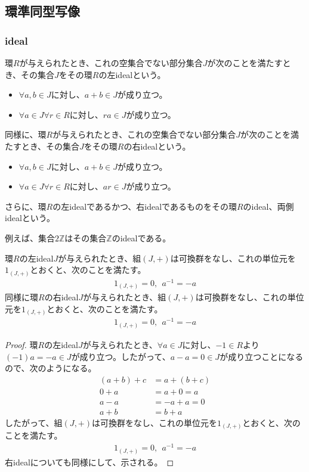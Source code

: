 \documentclass[dvipdfmx]{jsarticle}
\begin{document}
\subsection{環準同型写像}%
\subsubsection{ideal}%
\begin{axs}[idealの公理]
環$R$が与えられたとき、これの空集合でない部分集合$J$が次のことを満たすとき、その集合$J$をその環$R$の左idealという。
\begin{itemize}
\item
  $\forall a,b \in J$に対し、$a + b \in J$が成り立つ。
\item
  $\forall a \in J\forall r \in R$に対し、$ra \in J$が成り立つ。
\end{itemize}
同様に、環$R$が与えられたとき、これの空集合でない部分集合$J$が次のことを満たすとき、その集合$J$をその環$R$の右idealという。
\begin{itemize}
\item
  $\forall a,b \in J$に対し、$a + b \in J$が成り立つ。
\item
  $\forall a \in J\forall r \in R$に対し、$ar \in J$が成り立つ。
\end{itemize}
さらに、環$R$の左idealであるかつ、右idealであるものをその環$R$のideal、両側idealという。
\end{axs}\par
例えば、集合$2\mathbb{Z}$はその集合$\mathbb{Z}$のidealである。
\begin{thm}\label{3.3.2.1}
環$R$の左ideal$J$が与えられたとき、組$(J, + )$は可換群をなし、これの単位元を$1_{(J, + )}$とおくと、次のことを満たす。
\begin{align*}
1_{(J, + )} = 0,\ \ a^{- 1} = - a
\end{align*}
同様に環$R$の右ideal$J$が与えられたとき、組$(J, + )$は可換群をなし、これの単位元を$1_{(J, + )}$とおくと、次のことを満たす。
\begin{align*}
1_{(J, + )} = 0,\ \ a^{- 1} = - a
\end{align*}
\end{thm}
\begin{proof}
環$R$の左ideal$J$が与えられたとき、$\forall a \in J$に対し、$- 1 \in R$より$( - 1)a = - a \in J$が成り立つ。したがって、$a - a = 0 \in J$が成り立つことになるので、次のようになる。
\begin{align*}
(a + b) + c &= a + (b + c)\\
0 + a &= a + 0 = a\\
a - a &= - a + a = 0\\
a + b &= b + a
\end{align*}
したがって、組$(J, + )$は可換群をなし、これの単位元を$1_{(J, + )}$とおくと、次のことを満たす。
\begin{align*}
1_{(J, + )} = 0,\ \ a^{- 1} = - a
\end{align*}
右idealについても同様にして、示される。
\end{proof}
\end{document}

